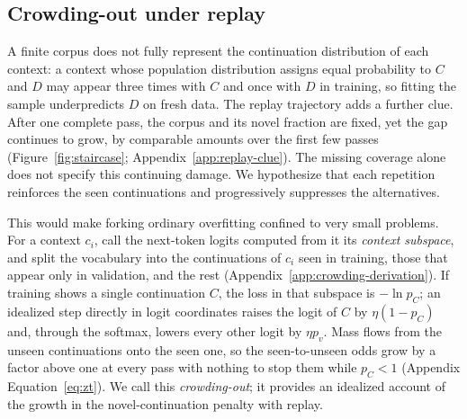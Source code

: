\subsection{Crowding-out under replay}
\label{sec:sharpening}
A finite corpus does not fully represent the continuation distribution of each context: a context whose population distribution assigns equal probability to $C$ and $D$ may appear three times with $C$ and once with $D$ in training, so fitting the sample underpredicts $D$ on fresh data. The replay trajectory adds a further clue. After one complete pass, the corpus and its novel fraction are fixed, yet the gap continues to grow, by comparable amounts over the first few passes (Figure~\ref{fig:staircase}; Appendix~\ref{app:replay-clue}). The missing coverage alone does not specify this continuing damage. We hypothesize that each repetition reinforces the seen continuations and progressively suppresses the alternatives.

This would make forking ordinary overfitting confined to very small problems. For a context $c_i$, call the next-token logits computed from it its \emph{context subspace}, and split the vocabulary into the continuations of $c_i$ seen in training, those that appear only in validation, and the rest (Appendix~\ref{app:crowding-derivation}). If training shows a single continuation $C$, the loss in that subspace is $-\ln p_C$; an idealized step directly in logit coordinates raises the logit of $C$ by $\eta(1-p_C)$ and, through the softmax, lowers every other logit by $\eta p_v$. Mass flows from the unseen continuations onto the seen one, so the seen-to-unseen odds grow by a factor above one at every pass with nothing to stop them while $p_C<1$ (Appendix Equation~\eqref{eq:zt}). We call this \emph{crowding-out}; it provides an idealized account of the growth in the novel-continuation penalty with replay.

